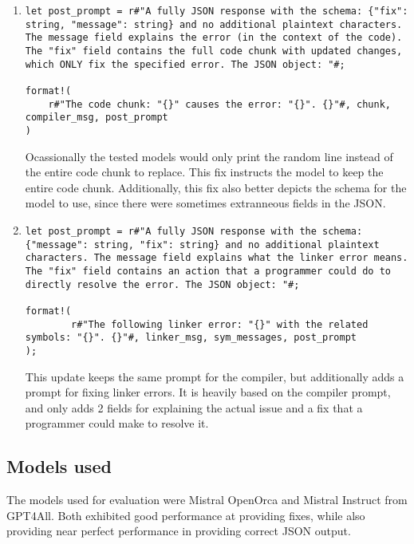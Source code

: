 \documentclass{article}
\begin{document}
\begin{enumerate}
			\item
			\begin{verbatim}
let post_prompt = r#"A fully JSON response with the schema: {"fix": string, "message": string} and no additional plaintext characters. The message field explains the error (in the context of the code). The "fix" field contains the full code chunk with updated changes, which ONLY fix the specified error. The JSON object: "#;

format!(
	r#"The code chunk: "{}" causes the error: "{}". {}"#, chunk, compiler_msg, post_prompt
)
			\end{verbatim}
			Ocassionally the tested models would only print the random line instead of the entire code chunk to replace. This fix instructs the model to keep the entire code chunk. Additionally, this fix also better depicts the schema for the model to use, since there were sometimes extranneous fields in the JSON.

			\item
			\begin{verbatim}
let post_prompt = r#"A fully JSON response with the schema: {"message": string, "fix": string} and no additional plaintext characters. The message field explains what the linker error means. The "fix" field contains an action that a programmer could do to directly resolve the error. The JSON object: "#;

format!(
        r#"The following linker error: "{}" with the related symbols: "{}". {}"#, linker_msg, sym_messages, post_prompt
);
			\end{verbatim}
			This update keeps the same prompt for the compiler, but additionally adds a prompt for fixing linker errors. It is heavily based on the compiler prompt, and only adds 2 fields for explaining the actual issue and a fix that a programmer could make to resolve it.
		\end{enumerate}
	\subsection{Models used}
		The models used for evaluation were Mistral OpenOrca and Mistral Instruct from GPT4All. Both exhibited good performance at providing fixes, while also providing near perfect performance in providing correct JSON output.
\end{document}
